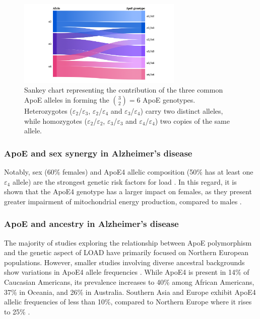 \documentclass{amsart}
\begin{document}
\begin{figure}[H]
  \includegraphics[width=0.7\textwidth]{figures/ApoE@2x.png}
    \caption{Sankey chart representing the contribution of the three common ApoE alleles in forming the $\binom{3}{2} = 6$ ApoE genotypes. Heterozygotes ($\varepsilon_2$/$\varepsilon_3$,  $\varepsilon_2$/$\varepsilon_4$ and $\varepsilon_3$/$\varepsilon_4$) carry two distinct alleles, while homozygotes ($\varepsilon_2$/$\varepsilon_2$, $\varepsilon_3$/$\varepsilon_3$ and $\varepsilon_4$/$\varepsilon_4$) two copies of the same allele.}
  \label{fig1}
\end{figure}

\subsubsection{ApoE and sex synergy in Alzheimer's disease}
Notably, sex (60\% females) and ApoE4 allelic composition (50\% has at least one $\varepsilon_4$ allele) are the strongest genetic risk factors for \acrshort{load} \cite{Arnold2020SexMetabolome}. In this regard, it is shown that the ApoE4 genotype has a larger impact on females, as they present greater impairment of mitochondrial energy production, compared to males \cite{Arnold2020SexMetabolome, Yassine2020APOEDisease}.

\subsubsection{ApoE and ancestry in Alzheimer's disease} \label{ancestry}
The majority of studies exploring the relationship between ApoE polymorphism and the genetic aspect of LOAD have primarily focused on Northern European populations\cite{Yang2023ApolipoproteinDisease}. However, smaller studies involving diverse ancestral backgrounds show variations in ApoE4 allele frequencies \cite{Yang2023ApolipoproteinDisease}. While ApoE4 is present in 14\% of Caucasian Americans, its prevalence increases to 40\% among African Americans, 37\% in Oceania, and 26\% in Australia. Southern Asia and Europe exhibit ApoE4 allelic frequencies of less than 10\%, compared to Northern Europe where it rises to 25\% \cite{Belloy2019AForward, Egert2012ApoEFactors, Eisenberg2010WorldwideHistory, Logue2011AAmericans}.
\end{document}
